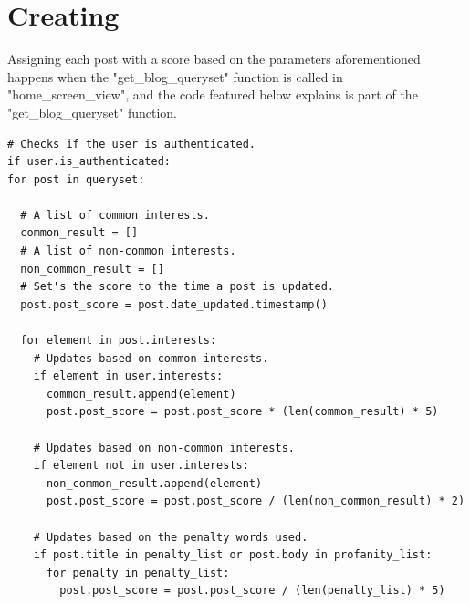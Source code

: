 \section {Creating}

Assigning each post with a score based on the parameters aforementioned happens when the "get\_blog\_queryset" function is called in "home\_screen\_view", and the code featured below explains is part of the "get\_blog\_queryset" function.


\lstset{language=Python}
\lstset{frame=lines}
\begin{lstlisting}
# Checks if the user is authenticated.
if user.is_authenticated:
for post in queryset:

  # A list of common interests.
  common_result = []
  # A list of non-common interests.
  non_common_result = []
  # Set's the score to the time a post is updated.
  post.post_score = post.date_updated.timestamp()

  for element in post.interests:
    # Updates based on common interests.
    if element in user.interests:
      common_result.append(element)
      post.post_score = post.post_score * (len(common_result) * 5)

    # Updates based on non-common interests.
    if element not in user.interests:
      non_common_result.append(element)
      post.post_score = post.post_score / (len(non_common_result) * 2)

    # Updates based on the penalty words used.
    if post.title in penalty_list or post.body in profanity_list:
      for penalty in penalty_list:
        post.post_score = post.post_score / (len(penalty_list) * 5)
\end{lstlisting}
